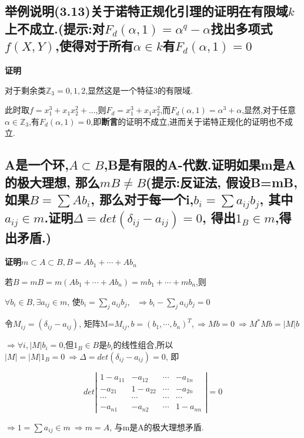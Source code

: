 \documentclass[UTF8]{book}
\begin{document}
	\subsection{举例说明(3.13)关于诺特正规化引理的证明在有限域$ k $上不成立.(提示:对$ F_{d}(\alpha,1) = \alpha^{q}-\alpha$找出多项式$ f(X,Y) $,使得对于所有$ \alpha \in k $有$ F_{d}(\alpha,1)=0 $}
	
	\textbf{证明}
	
	对于剩余类$ \mathbb{Z}_{3} = {0,1,2}$,显然这是一个特征3的有限域.
	
	此时取$ f = x_{1}^{3}+x_{1}x_{2}^{2}+...$,则$ F_{d}=x_{1}^{3}+x_{1}x_{2}^{2} $,而$ F_{d}(\alpha,1) = \alpha^{3}+\alpha $,显然,对于任意$ \alpha \in  \mathbb{Z}_{3}$,有$ F_{d}(\alpha,1) = 0 $,即\textbf{断言}的证明不成立,进而关于诺特正规化的证明也不成立.
	
	
	\subsection{A是一个环,$A\subset B$,B是有限的A-代数.证明如果m是A的极大理想, 那么$mB\neq B$(提示:反证法, 假设B=mB,如果$B=\sum Ab_{i} $, 那么对于每一个i,$ b_{i}=\sum a_{ij}b_{j}$, 其中$a_{ij}\in m$.证明$\Delta=det(\delta_{ij}-a_{ij})=0$, 得出$1_{B}\in m$,得出矛盾.)}
	
	\textbf{证明}$m\subset A\subset B, B=Ab_{1}+ \cdots +Ab_{n}$
	
	若$B=mB=m(Ab_{1}+ \cdots +Ab_{n})=mb_{1}+ \cdots +mb_{n}$,则
	
	$\forall b_{i}\in B, \exists a_{ij}\in m$, 使$b_{i}=\sum_{j} a_{ij}b_{j}$, \ $\Rightarrow b_{i}-\sum_{j} a_{ij}b_{j}=0$
	
	令$M_{ij}=(\delta_{ij}-a_{ij})$, 矩阵M=$M_{ij},b=(b_{1}, \cdots ,b_{n})^{T},\Rightarrow Mb=0 \ \Rightarrow M^{*}Mb=\vert M \vert b$
	
	$\Rightarrow \forall i, \vert M \vert b_{i}=0$,但$1_{B}\in B$是$b_{i}$的线性组合,所以$\vert M \vert=\vert M \vert 1_{B}=0 \  \Rightarrow \Delta=det(\delta_{ij}-a_{ij})=0$, 即
	
	\[
	det\left|\begin{array}{ccccccccc}
	1-a_{11} &  -a_{12} & \cdots &-a_{1n} \\
	-a_{21} & 1-a_{22} & \cdots &-a_{2n}\\
	\cdots & \cdots &\cdots & \cdots\\
	-a_{n1} & -a_{n2} & \cdots &1-a_{nn}
	
	\end{array}\right|=0
	\]
	
	$\Rightarrow 1=\sum a_{ij}\in m \ \Rightarrow m=A$, 与m是A的极大理想矛盾.
\end{document}
